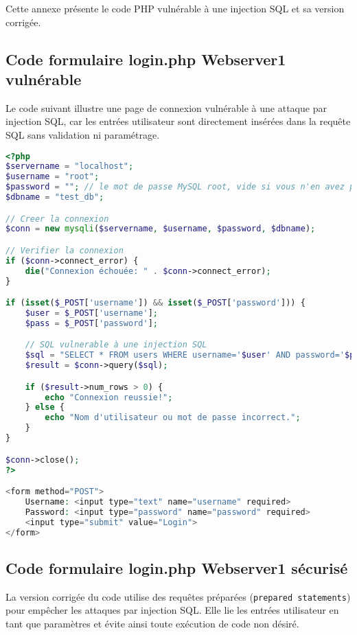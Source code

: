 \documentclass[a4paper,12pt]{report}
\begin{document}
Cette annexe présente le code PHP vulnérable à une injection SQL et sa version corrigée.

\subsection{Code formulaire login.php Webserver1 vulnérable}

Le code suivant illustre une page de connexion vulnérable à une attaque par injection SQL, car les entrées utilisateur sont directement insérées dans la requête SQL sans validation ni paramétrage.

\begin{lstlisting}[language=PHP, caption=Code vulnérable à l'injection SQL]
<?php
$servername = "localhost";
$username = "root";
$password = ""; // le mot de passe MySQL root, vide si vous n'en avez pas defini un
$dbname = "test_db";

// Creer la connexion
$conn = new mysqli($servername, $username, $password, $dbname);

// Verifier la connexion
if ($conn->connect_error) {
    die("Connexion échouée: " . $conn->connect_error);
}

if (isset($_POST['username']) && isset($_POST['password'])) {
    $user = $_POST['username'];
    $pass = $_POST['password'];

    // SQL vulnerable à une injection SQL
    $sql = "SELECT * FROM users WHERE username='$user' AND password='$pass'";
    $result = $conn->query($sql);

    if ($result->num_rows > 0) {
        echo "Connexion reussie!";
    } else {
        echo "Nom d'utilisateur ou mot de passe incorrect.";
    }
}

$conn->close();
?>

<form method="POST">
    Username: <input type="text" name="username" required>
    Password: <input type="password" name="password" required>
    <input type="submit" value="Login">
</form>
\end{lstlisting}

\subsection{Code formulaire login.php Webserver1 sécurisé}

La version corrigée du code utilise des requêtes préparées (\texttt{prepared statements}) pour empêcher les attaques par injection SQL. Elle lie les entrées utilisateur en tant que paramètres et évite ainsi toute exécution de code non désiré.
\end{document}
